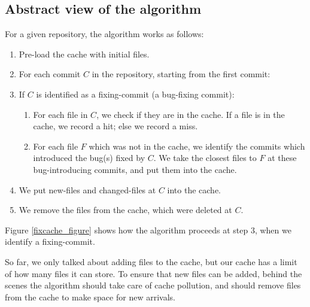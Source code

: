 \documentclass[12pt,twoside,notitlepage]{report}
\begin{document}
\subsection{Abstract view of the algorithm}
For a given repository, the algorithm works as follows:
\begin{enumerate}
	\item Pre-load the cache with initial files.
	\item For each commit $C$ in the repository, starting from the first commit:
	
	\item If $C$ is identified as a fixing-commit (a bug-fixing commit):
	\begin{enumerate}
	\item \label{lookup} For each file in $C$, we check if they are in the cache. If a file is in the cache, we record a hit; else we record a miss.
	\item For each file $F$ which was not in the cache, we identify the commits which introduced the bug(s) fixed by $C$. We take the closest files to $F$ at these bug-introducing commits, and put them into the cache.
	\end{enumerate}
	\item We put new-files and changed-files at $C$ into the cache.
	\item We remove the files from the cache, which were deleted at $C$.
\end{enumerate}

Figure \ref{fixcache_figure} shows how the algorithm proceeds at step 3, when we identify a fixing-commit.

So far, we only talked about adding files to the cache, but our cache has a limit of how many files it can store. To ensure that new files can be added, behind the scenes the algorithm should take care of cache pollution, and should remove files from the cache to make space for new arrivals.
\end{document}
